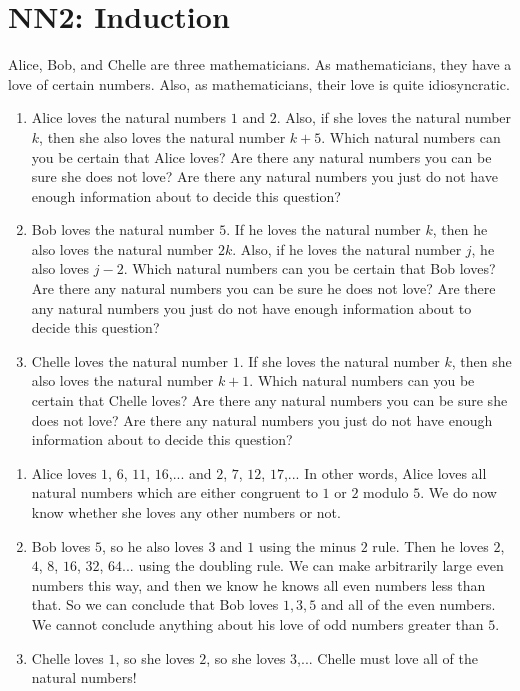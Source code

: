 \section{NN2: Induction}

\begin{xca}

Alice, Bob, and Chelle are three mathematicians. As mathematicians, they have a love of certain numbers. Also, as mathematicians, their love is quite idiosyncratic.

\begin{enumerate}
\item Alice loves the natural numbers $1$ and $2$. Also, if she loves the natural number $k$, then she also loves the natural number $k+5$. Which natural numbers can you be certain that Alice loves? Are there any natural numbers you can be sure she does not love? Are there any natural numbers you just do not have enough information about to decide this question?

\item Bob loves the natural number $5$. If he loves the natural number $k$, then he also loves the natural number $2k$. Also, if he loves the natural number $j$, he also loves $j-2$. Which natural numbers can you be certain that Bob loves? Are there any natural numbers you can be sure he does not love? Are there any natural numbers you just do not have enough information about to decide this question?

\item Chelle loves the natural number $1$. If she loves the natural number $k$, then she also loves the natural number $k+1$. Which natural numbers can you be certain that Chelle loves? Are there any natural numbers you can be sure she does not love? Are there any natural numbers you just do not have enough information about to decide this question?
\end{enumerate}
\end{xca}

\begin{solutions}
	\begin{enumerate}
			\item Alice loves $1$, $6$, $11$, $16$,... and $2$, $7$, $12$, $17$,...
			In other words, Alice loves all natural numbers which are either congruent to $1$ or $2$ modulo $5$.  We do now know whether she loves any other numbers or not.
			\item Bob loves $5$, so he also loves $3$ and $1$ using the minus $2$ rule.  Then he loves $2$, $4$, $8$, $16$, $32$, $64$... using the doubling rule.  We can make arbitrarily large even numbers this way, and then we know he knows all even numbers less than that.  So we can conclude that Bob loves $1,3,5$ and all of the even numbers.  We cannot conclude anything about his love of odd numbers greater than $5$.
			\item Chelle loves $1$, so she loves $2$, so she loves $3$,...  Chelle must love all of the natural numbers!
		\end{enumerate}
	\end{solutions}

